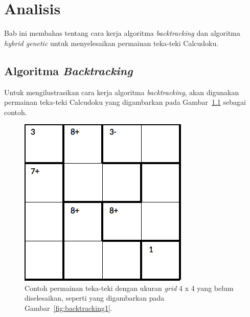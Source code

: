 \chapter{Analisis}
\label{chap:analisis}

Bab ini membahas tentang cara kerja algoritma \textit{backtracking} dan algoritma \textit{hybrid genetic} untuk menyelesaikan permainan teka-teki Calcudoku.

\section{Algoritma \textit{Backtracking}}
\label{sec:analisisbt}

Untuk mengilustrasikan cara kerja algoritma \textit{backtracking}, akan digunakan permainan teka-teki Calcudoku yang digambarkan pada Gambar~\ref{fig:analisisbt1} sebagai contoh.

\begin{figure}
\centering
\captionsetup{justification=centering}
\includegraphics[scale=0.333]{Gambar/backtracking/State1}
\caption[Contoh permainan teka-teki Calcudoku dengan ukuran \textit{grid} 4 x 4 yang belum diselesaikan, seperti yang digambarkan pada Gambar~\ref{fig:backtracking1}.  ~\cite{fahda:16:backtracking}]{Contoh permainan teka-teki dengan ukuran \textit{grid} 4 x 4 yang belum diselesaikan, seperti yang digambarkan pada Gambar~\ref{fig:backtracking1}.  ~\cite{fahda:16:backtracking}}
\label{fig:analisisbt1}
\end{figure}

